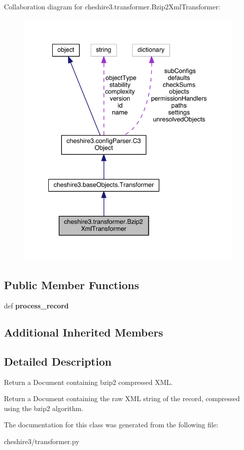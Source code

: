 Collaboration diagram for cheshire3.\-transformer.\-Bzip2\-Xml\-Transformer\-:
\nopagebreak
\begin{figure}[H]
\begin{center}
\leavevmode
\includegraphics[width=331pt]{classcheshire3_1_1transformer_1_1_bzip2_xml_transformer__coll__graph}
\end{center}
\end{figure}
\subsection*{Public Member Functions}
\begin{DoxyCompactItemize}
\item 
\hypertarget{classcheshire3_1_1transformer_1_1_bzip2_xml_transformer_a464cfe163e41109e2c4254bff6b07efd}{def {\bfseries process\-\_\-record}}\label{classcheshire3_1_1transformer_1_1_bzip2_xml_transformer_a464cfe163e41109e2c4254bff6b07efd}

\end{DoxyCompactItemize}
\subsection*{Additional Inherited Members}


\subsection{Detailed Description}
\begin{DoxyVerb}Return a Document containing bzip2 compressed XML.

Return a Document containing the raw XML string of the record, compressed
using the bzip2 algorithm.
\end{DoxyVerb}
 

The documentation for this class was generated from the following file\-:\begin{DoxyCompactItemize}
\item 
cheshire3/transformer.\-py\end{DoxyCompactItemize}
